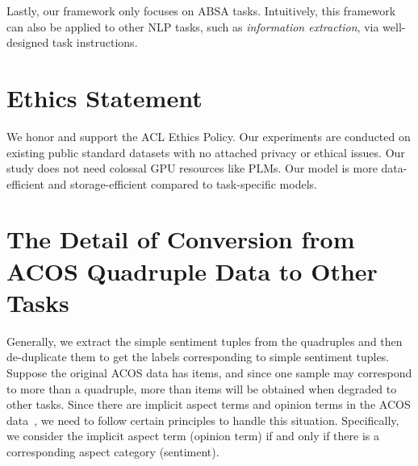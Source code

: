 \documentclass[11pt]{article}
\begin{document}
Lastly, our framework only focuses on ABSA tasks. Intuitively, this framework can also be applied to other NLP tasks, such as \emph{information extraction}, via well-designed task instructions.




\section*{Ethics Statement}

We honor and support the ACL Ethics Policy. Our experiments are conducted on existing public standard datasets with no attached privacy or ethical issues. Our study does not need colossal GPU resources like PLMs. Our model is more data-efficient and storage-efficient compared to task-specific models. 











\appendix








\section{The Detail of Conversion from ACOS Quadruple Data to Other Tasks}
\label{sec-appendix:acos-data-conversion}

Generally, we extract the simple sentiment tuples from the quadruples and then de-duplicate them to get the labels corresponding to simple sentiment tuples. Suppose the original ACOS data has  items, and since one sample may correspond to more than a quadruple, more than  items will be obtained when degraded to other tasks. Since there are implicit aspect terms and opinion terms in the ACOS data~\citep{cai-etal-2021-acos}, we need to follow certain principles to handle this situation. Specifically, we consider the implicit aspect term (opinion term) if and only if there is a corresponding aspect category (sentiment).
\end{document}
